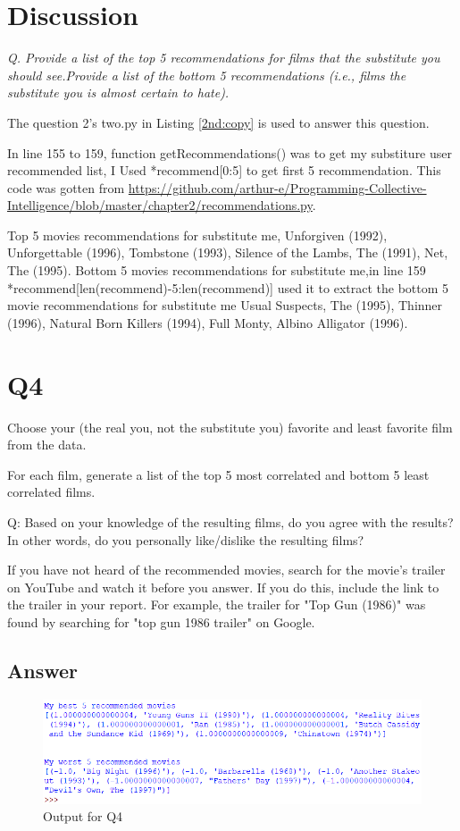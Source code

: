 \documentclass[12pt]{article}
\begin{document}
\section*{Discussion}
\emph{Q. Provide a list of the top 5 recommendations for films that the substitute you should see.Provide a list of the bottom 5 recommendations (i.e., films the substitute you is almost certain to hate).}

The question 2's two.py in Listing \ref{2nd:copy} is used to answer this question.

In line 155 to 159, function getRecommendations() was to get my substiture user recommended list, I Used *recommend[0:5] to get first 5 recommendation. This code was gotten from \url{https://github.com/arthur-e/Programming-Collective-Intelligence/blob/master/chapter2/recommendations.py}. 

Top 5 movies recommendations for substitute me, Unforgiven (1992), Unforgettable (1996), Tombstone (1993), Silence of the Lambs, The (1991), Net, The (1995). Bottom 5 movies recommendations for substitute me,in line 159 *recommend[len(recommend)-5:len(recommend)] used it to extract the bottom 5 movie recommendations for substitute me Usual Suspects, The (1995), Thinner (1996), Natural Born Killers (1994), Full Monty, Albino Alligator (1996).

\section*{Q4}
Choose your (the real you, not the substitute you) favorite and least favorite film from the data.

For each film, generate a list of the top 5 most correlated and bottom 5 least correlated films.

Q: Based on your knowledge of the resulting films, do you agree with the results? In other words, do you personally like/dislike the resulting films?

If you have not heard of the recommended movies, search for the movie's trailer on YouTube and watch it before you answer. If you do this, include the link to the trailer in your report. For example, the trailer for "Top Gun (1986)" was found by searching for "top gun 1986 trailer" on Google.
\subsection*{Answer}
\clearpage
\begin{figure}[h]
    \centering
    \includegraphics[trim=0 0 0 0, clip, width=\textwidth] {Capture3.PNG}
    \caption{Output for Q4}
    \label{fig2}
\end{figure}
\end{document}
